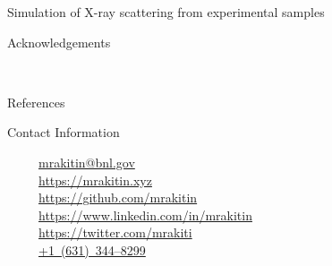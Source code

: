 \documentclass[final]{beamer}
\newlength{\onecolwid}
\newcommand{\colorify}[1]{\textcolor{linkcolor}{#1}}
\newcommand{\mylink}[1]{\href{#1}{\colorify{#1}}}
\newcommand{\mylinkm}[1]{\href{mailto:#1?subject=Your poster at the "Automation in Beamline Control and Data Acquisition" workshop}{\colorify{#1}}}
\newcommand{\mylinkt}[1]{\href{tel:#1}{#1}}
\begin{document}
\begin{frame}[t]
\begin{columns}[t]
\begin{column}{\onecolwid}
\begin{block}{\faSpinner{} Simulation of X-ray scattering from experimental samples}
\end{block}





\begin{block}{\faThumbsOUp{} Acknowledgements}

\small{} \\

\end{block}



\begin{block}{\faBook{} References}
\nocite{*} %
\scriptsize{
 \vspace{-0.48cm}}

\end{block}




\begin{alertblock}{\faSendO{} Contact Information}

~~~\faEnvelopeO~~\mylinkm{mrakitin@bnl.gov} \\
~~~\faGlobe~~\mylink{https://mrakitin.xyz} \\
~~~\faGithub~~\mylink{https://github.com/mrakitin} \\
~~~\faLinkedinSquare~~\mylink{https://www.linkedin.com/in/mrakitin} \\
~~~\faTwitter~~\mylink{https://twitter.com/mrakiti} \\
~~~\faPhoneSquare~~\mylinkt{+1~(631)~344--8299} \\


\end{alertblock}
\end{column}
\end{columns}
\end{frame}
\end{document}
